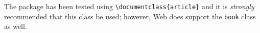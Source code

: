 \documentclass{article}
\def\Web{\textsf{Web}}
\begin{document}
\redpoint The package has been tested using
\verb+\documentclass{article}+ and it is \emph{strongly}
recommended that this class be used; however, {\Web} does support the
\texttt{book} class as well.

%
%
%
%
%
%
%
%
%
%
%

\end{document}
